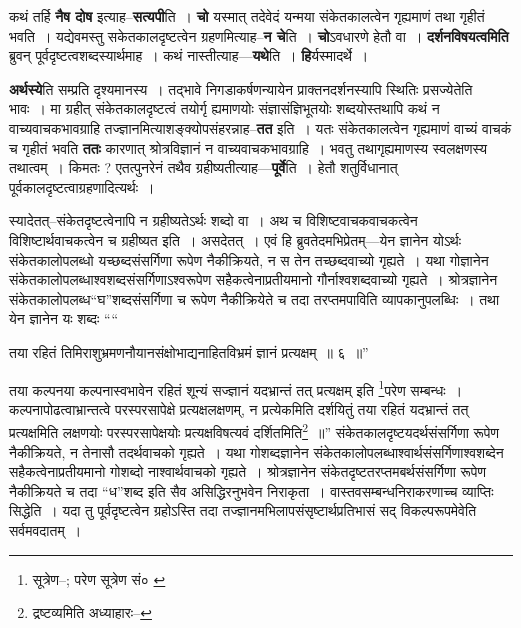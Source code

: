\documentclass[article,12pt,a4paper]{memoir}
\begin{document}
	  \pstart कथं तर्हि \textbf{नैष दोष} इत्याह--\textbf{सत्यपी}ति । \textbf{चो} यस्मात् तदेवेदं यन्मया संकेतकालत्वेन गृह्यमाणं तथा गृहीतं भवति । यद्येवमस्तु सकेतकालदृष्टत्वेन ग्रहणमित्याह--\textbf{न चे}ति । \textbf{चो}ऽवधारणे हेतौ वा । \textbf{दर्शनविषयत्वमिति} ब्रुवन् पूर्वदृष्टत्वशब्दस्यार्थमाह । कथं नास्तीत्याह—\textbf{यथे}ति । \textbf{हि}र्यस्मादर्थे ।
	\pend
      

	  \pstart \textbf{अर्थस्ये}ति सम्प्रति दृश्यमानस्य । तद्भावे निगडाकर्षणन्यायेन प्राक्तनदर्शनस्यापि स्थितिः प्रसज्येतेति भावः । मा ग्रहीत् संकेतकालदृष्टत्वं तयोर्गृ ह्यमाणयोः संज्ञासंज्ञिभूतयोः शब्दयोस्तथापि कथं न वाच्यवाचकभावग्राहि तज्ज्ञानमित्याशङ्क्योपसंहरन्नाह--\textbf{तत} इति । यतः संकेतकालत्वेन गृह्यमाणं वाच्यं वाचकं च गृहीतं भवति \textbf{ततः} कारणात् श्रोत्रविज्ञानं न वाच्यवाचकभावग्राहि । भवतु तथागृह्यमाणस्य स्वलक्षणस्य तथात्वम् । किमतः ? एतत्पुनरेनं तथैव ग्रहीष्यतीत्याह—\textbf{पूर्वे}ति । हेतौ शतुर्विधानात् पूर्वकालदृष्टत्वाग्रहणादित्यर्थः ।
	\pend
      

	  \pstart स्यादेतत्--संकेतदृष्टत्वेनापि न ग्रहीष्यतेऽर्थः शब्दो वा । अथ च विशिष्टवाचकवाचकत्वेन विशिष्टार्थवाचकत्वेन च ग्रहीष्यत इति । असदेतत् । एवं हि ब्रुवतेदमभिप्रेतम्—येन ज्ञानेन योऽर्थः संकेतकालोपलब्धो यच्छब्दसंसर्गिणा रूपेण नैकीक्रियते, न स तेन तच्छब्दवाच्यो गृह्यते । यथा गोज्ञानेन संकेतकालोपलब्धाश्वशब्दसंसर्गिणाऽश्वरूपेण सहैकत्वेनाप्रतीयमानो गौर्नाश्वशब्दवाच्यो गृह्यते । श्रोत्रज्ञानेन संकेतकालोपलब्ध“घ”शब्दसंसर्गिणा च रूपेण नैकीक्रियेते च तदा तरप्तमपाविति व्यापकानुपलब्धिः । तथा येन ज्ञानेन यः शब्दः  \leavevmode{} ““
	  
	तया रहितं तिमिराशुभ्रमणनौयानसंक्षोभाद्यनाहितविभ्रमं ज्ञानं प्रत्यक्षम् ॥ ६ ॥” 
	  
	तया कल्पनया कल्पनास्वभावेन रहितं शून्यं सज्ज्ञानं यदभ्रान्तं तत् प्रत्यक्षम् इति \footnote{सूत्रेण--\cite{dp-msD-n}; परेण सूत्रेण सं० \cite{dp-msB}}\-परेण सम्बन्धः । कल्पनापोढत्वाभ्रान्तत्वे परस्परसापेक्षे प्रत्यक्षलक्षणम्, न प्रत्येकमिति दर्शयितुं तया रहितं यदभ्रान्तं तत् प्रत्यक्षमिति लक्षणयोः परस्परसापेक्षयोः प्रत्यक्षविषत्यवं दर्शितमिति\footnote{द्रष्टव्यमिति अध्याहारः--\cite{dp-msD-n}} ॥” संकेतकालदृष्टयदर्थसंसर्गिणा रूपेण नैकीक्रियते, न तेनासौ तदर्थवाचको गृह्यते । यथा गोशब्दज्ञानेन संकेतकालोपलब्धाश्वार्थसंसर्गिणाश्वशब्देन सहैकत्वेनाप्रतीयमानो गोशब्दो नाश्वार्थवाचको गृह्यते । श्रोत्रज्ञानेन संकेतदृष्टतरप्तमबर्थसंसर्गिणा रूपेण नैकीक्रियते च तदा “ध”शब्द इति सैव असिद्धिरनुभवेन निराकृता । वास्तवसम्बन्धनिराकरणाच्च व्याप्तिः सिद्धेति । यदा तु पूर्वदृष्टत्वेन ग्रहोऽस्ति तदा तज्ज्ञानमभिलापसंसृष्टार्थप्रतिभासं सद् विकल्परूपमेवेति सर्वमवदातम् ।
	\pend
      
\end{document}
